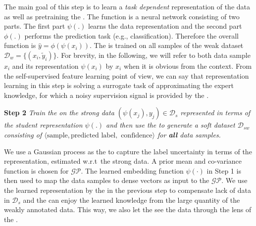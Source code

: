 The main goal of this step is to learn a \emph{task dependent} representation of the data as well as pretraining the \std. The \std function is a neural network consisting of two parts. The first part $\psi(.)$ learns the data representation and the second part $\phi(.)$ performs the prediction task (e.g., classification). Therefore the overall function is $\hat{y}=\phi(\psi(x_i))$. The \std is trained on all samples of the weak dataset $\mathcal{D}_w=\{(x_i, \tilde{y}_i)\}$. For brevity, in the following, we will refer to both data sample $x_i$ and its representation $\psi(x_i)$ by $x_i$ when it is obvious from the context. 
From the self-supervised feature learning point of view, we can say that representation learning in this step is solving a surrogate task of approximating the expert knowledge, for which a noisy supervision signal is provided by the \wa.  


\textbf{Step 2} \emph{Train the \tch on the strong data $(\psi(x_j),y_j) \in \mathcal{D}_s$ represented in terms of the student representation $\psi(.)$ and then use the \tch to generate a soft dataset $\mathcal{D}_{sw}$ consisting of $\langle \textrm{sample}, \textrm{predicted label}, \textrm{ confidence} \rangle$ for \textbf{all} data samples.} 

We use a Gaussian process as the \tch to capture the label uncertainty in terms of the \std representation, estimated w.r.t\ the strong data. A prior mean and co-variance function is chosen for $\mathcal{GP}$. The learned embedding function $\psi(\cdot)$ in Step 1 is then used to map the data samples to dense vectors as input to the $\mathcal{GP}$. 
We use the learned representation by the \std in the previous step to compensate lack of data in $\mathcal{D}_s$ and the \tch can enjoy the learned knowledge from the large quantity of the weakly annotated data. This way, we also let the \tch  see the data through the lens of the \std.

